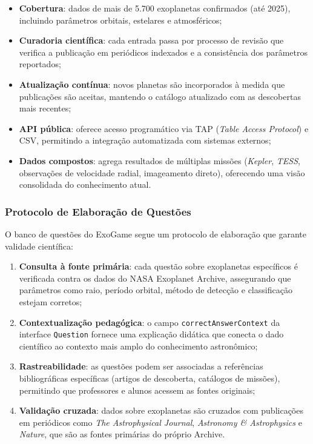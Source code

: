 \documentclass[
	12pt,
	openany,
	oneside,
	a4paper,
	english,
	brazil
]{abntex2}
\begin{document}
\begin{itemize}
  \item \textbf{Cobertura}: dados de mais de 5.700 exoplanetas confirmados (até 2025), incluindo parâmetros orbitais, estelares e atmosféricos;
  \item \textbf{Curadoria científica}: cada entrada passa por processo de revisão que verifica a publicação em periódicos indexados e a consistência dos parâmetros reportados;
  \item \textbf{Atualização contínua}: novos planetas são incorporados à medida que publicações são aceitas, mantendo o catálogo atualizado com as descobertas mais recentes;
  \item \textbf{API pública}: oferece acesso programático via TAP (\textit{Table Access Protocol}) e CSV, permitindo a integração automatizada com sistemas externos;
  \item \textbf{Dados compostos}: agrega resultados de múltiplas missões (\textit{Kepler}, \textit{TESS}, observações de velocidade radial, imageamento direto), oferecendo uma visão consolidada do conhecimento atual.
\end{itemize}

\subsubsection{Protocolo de Elaboração de Questões}

O banco de questões do ExoGame segue um protocolo de elaboração que garante validade científica:

\begin{enumerate}
  \item \textbf{Consulta à fonte primária}: cada questão sobre exoplanetas específicos é verificada contra os dados do NASA Exoplanet Archive, assegurando que parâmetros como raio, período orbital, método de detecção e classificação estejam corretos;
  \item \textbf{Contextualização pedagógica}: o campo \texttt{correctAnswerContext} da interface \texttt{Question} fornece uma explicação didática que conecta o dado científico ao contexto mais amplo do conhecimento astronômico;
  \item \textbf{Rastreabilidade}: as questões podem ser associadas a referências bibliográficas específicas (artigos de descoberta, catálogos de missões), permitindo que professores e alunos acessem as fontes originais;
  \item \textbf{Validação cruzada}: dados sobre exoplanetas são cruzados com publicações em periódicos como \textit{The Astrophysical Journal}, \textit{Astronomy \& Astrophysics} e \textit{Nature}, que são as fontes primárias do próprio Archive.
\end{enumerate}
\end{document}
